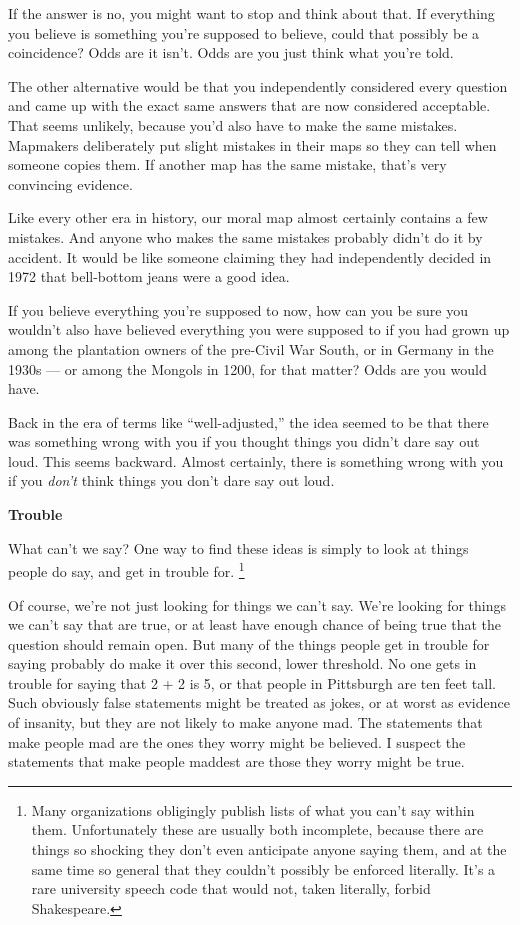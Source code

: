\documentclass[12pt]{book}
\begin{document}
If the answer is no, you might want to stop and think about that. If
everything you believe is something you're supposed to believe, could
that possibly be a coincidence? Odds are it isn't. Odds are you just
think what you're told.

The other alternative would be that you independently considered every
question and came up with the exact same answers that are now considered
acceptable. That seems unlikely, because you'd also have to make the
same mistakes. Mapmakers deliberately put slight mistakes in their maps
so they can tell when someone copies them. If another map has the same
mistake, that's very convincing evidence.

Like every other era in history, our moral map almost certainly contains
a few mistakes. And anyone who makes the same mistakes probably didn't
do it by accident. It would be like someone claiming they had
independently decided in 1972 that bell-bottom jeans were a good idea.

If you believe everything you're supposed to now, how can you be sure
you wouldn't also have believed everything you were supposed to if you
had grown up among the plantation owners of the pre-Civil War South, or
in Germany in the 1930s --- or among the Mongols in 1200, for that
matter? Odds are you would have.

Back in the era of terms like ``well-adjusted,'' the idea seemed to be
that there was something wrong with you if you thought things you didn't
dare say out loud. This seems backward. Almost certainly, there is
something wrong with you if you \emph{don't} think things you don't dare
say out loud.

\textbf{Trouble}

What can't we say? One way to find these ideas is simply to look at
things people do say, and get in trouble for. \footnote{Many organizations obligingly publish lists of what you can't
say within them. Unfortunately these are usually both incomplete,
because there are things so shocking they don't even anticipate anyone
saying them, and at the same time so general that they couldn't possibly
be enforced literally. It's a rare university speech code that would
not, taken literally, forbid Shakespeare.}

Of course, we're not just looking for things we can't say. We're looking
for things we can't say that are true, or at least have enough chance of
being true that the question should remain open. But many of the things
people get in trouble for saying probably do make it over this second,
lower threshold. No one gets in trouble for saying that 2 + 2 is 5, or
that people in Pittsburgh are ten feet tall. Such obviously false
statements might be treated as jokes, or at worst as evidence of
insanity, but they are not likely to make anyone mad. The statements
that make people mad are the ones they worry might be believed. I
suspect the statements that make people maddest are those they worry
might be true.
\end{document}

